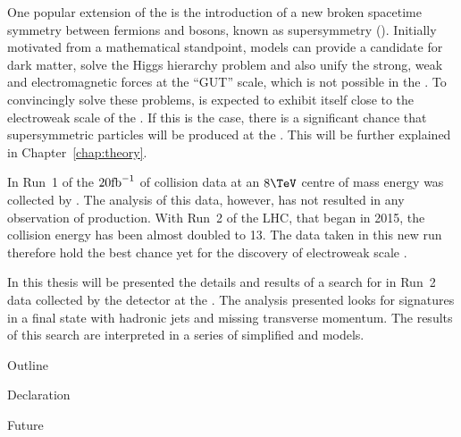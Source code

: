 One popular extension of the \SM is the introduction of a new broken
spacetime symmetry between fermions and bosons, known as supersymmetry
(\SUSY). Initially motivated from a mathematical standpoint, \SUSY
models can provide a candidate for dark matter, solve the Higgs
hierarchy problem and also unify the strong, weak and electromagnetic
forces at the ``GUT'' scale, which is not possible in the \SM. To
convincingly solve these problems, \SUSY is expected to exhibit itself
close to the electroweak scale of the \SM. If this is the case, there
is a significant chance that supersymmetric particles will be produced
at the \LHC. This will be further explained in
Chapter~\ref{chap:theory}.

In Run~1 of the \LHC $20\text{fb}^{-1}$ of collision data at an $8\tev$ centre of
mass energy was collected by \CMS. The analysis of this data, however,
has not resulted in any observation of \SUSY production. With Run~2 of
the LHC, that began in 2015, the collision energy has been almost
doubled to 13\tev. The data taken in this new run therefore hold the
best chance yet for the discovery of electroweak scale \SUSY.

In this thesis will be presented the details and results of a search
for \SUSY in Run~2 data collected by the \CMS detector at the \LHC.  The
analysis presented looks for \SUSY signatures in a final state with
hadronic jets and missing transverse momentum. The results of this
search are interpreted in a series of simplified \SUSY and \DM models.

Outline 

Declaration

Future

%
